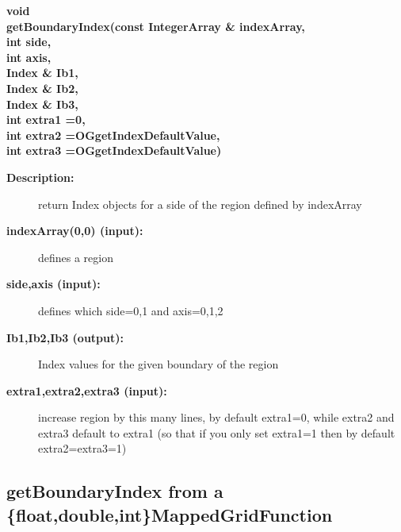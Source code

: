 \begin{flushleft} \textbf{%
void  \\ 
\settowidth{\OGgetIndexIncludeArgIndent}{getBoundaryIndex(}%
getBoundaryIndex(const IntegerArray \& indexArray, \\ 
\hspace{\OGgetIndexIncludeArgIndent}int side, \\ 
\hspace{\OGgetIndexIncludeArgIndent}int axis, \\ 
\hspace{\OGgetIndexIncludeArgIndent}Index \& Ib1, \\ 
\hspace{\OGgetIndexIncludeArgIndent}Index \& Ib2, \\ 
\hspace{\OGgetIndexIncludeArgIndent}Index \& Ib3, \\ 
\hspace{\OGgetIndexIncludeArgIndent}int extra1 =0,\\ 
\hspace{\OGgetIndexIncludeArgIndent}int extra2 =OGgetIndexDefaultValue,\\ 
\hspace{\OGgetIndexIncludeArgIndent}int extra3   =OGgetIndexDefaultValue)
}\end{flushleft}
\begin{description}
\item[{\bf Description:}] 
   return Index objects for a side of the region defined by indexArray

\item[{\bf indexArray(0,0) (input):}]  defines a region
\item[{\bf side,axis (input):}]  defines which side=0,1 and axis=0,1,2
\item[{\bf Ib1,Ib2,Ib3 (output):}]  Index values for the given boundary of the region
\item[{\bf extra1,extra2,extra3 (input):}]  increase region by this many lines, by default extra1=0, while 
                         extra2 and extra3 default to extra1 (so that if you only set extra1=1
                         then by default extra2=extra3=1)
\end{description}
\subsection{getBoundaryIndex from a \{float,double,int\}MappedGridFunction}
 
